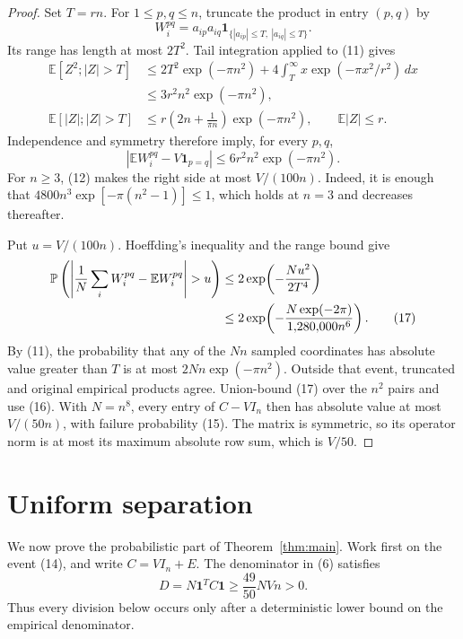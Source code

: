 \documentclass[11pt]{article}
\theoremstyle{remark}
\newcommand{\one}{\mathbf 1}
\newcommand{\E}{\mathbb E}
\newcommand{\Prob}{\mathbb P}
\begin{document}
\begin{proof}
Set \(T=rn\).  For \(1\le p,q\le n\), truncate the product in
entry \((p,q)\) by
\[
 W_i^{pq}=a_{ip}a_{iq}
 \mathbf1_{\{|a_{ip}|\le T,\ |a_{iq}|\le T\}}.
\]
Its range has length at most \(2T^2\).  Tail integration applied to
(11) gives
\begin{align*}
 \E[Z^2;|Z|>T]
 &\le 2T^2\exp(-\pi n^2)
   +4\int_T^\infty x\exp(-\pi x^2/r^2)\,dx\\
 &\le3r^2n^2\exp(-\pi n^2),\\
 \E[|Z|;|Z|>T]
 &\le r\left(2n+\frac1{\pi n}\right)\exp(-\pi n^2),
 \qquad \E|Z|\le r.
\end{align*}
Independence and symmetry therefore imply, for every \(p,q\),
\[
 \left|\E W_i^{pq}-V\mathbf1_{p=q}\right|
 \le6r^2n^2\exp(-\pi n^2).
 \tag{16}
\]
For \(n\ge3\), (12) makes the right side at most \(V/(100n)\).
Indeed, it is enough that
\(4800n^3\exp[-\pi(n^2-1)]\le1\), which holds at \(n=3\) and
decreases thereafter.

Put \(u=V/(100n)\).  Hoeffding's inequality
\cite{Hoeffding1963} and the range bound give
\begin{align}
 \Prob\left(\left|\frac1N\sum_iW_i^{pq}
 -\E W_i^{pq}\right|>u\right)
 &\le2\exp\!\left(-\frac{Nu^2}{2T^4}\right)\notag\\
 &\le2\exp\!\left(
 -\frac{N\exp(-2\pi)}{1{,}280{,}000n^6}\right).
 \tag{17}
\end{align}
By (11), the probability that any of the \(Nn\) sampled coordinates
has absolute value greater than \(T\) is at most
\(2Nn\exp(-\pi n^2)\).  Outside that event, truncated and original
empirical products agree.  Union-bound (17) over the \(n^2\) pairs
and use (16).  With \(N=n^8\), every entry of \(C-VI_n\) then has
absolute value at most \(V/(50n)\), with failure probability (15).
The matrix is symmetric, so its operator norm is at most its maximum
absolute row sum, which is \(V/50\).
\end{proof}

\section{Uniform separation}

We now prove the probabilistic part of Theorem~\ref{thm:main}.  Work
first on the event (14), and write \(C=VI_n+E\).  The denominator in
(6) satisfies
\[
 D=N\one^TC\one\ge\frac{49}{50}NVn>0.
 \tag{18}
\]
Thus every division below occurs only after a deterministic lower bound
on the empirical denominator.
\end{document}
